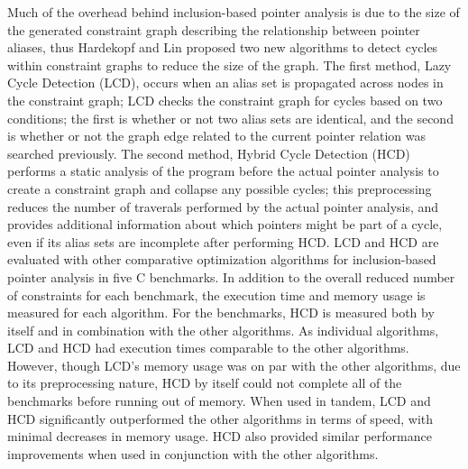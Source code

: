 Much of the overhead behind inclusion-based pointer analysis is due to the size of the generated constraint graph describing the relationship between pointer aliases, thus Hardekopf and Lin \cite{Hardekopf} proposed two new algorithms to detect cycles within constraint graphs to reduce the size of the graph. The first method, Lazy Cycle Detection (LCD), occurs when an alias set is propagated across nodes in the constraint graph; LCD checks the constraint graph for cycles based on two conditions; the first is whether or not two alias sets are identical, and the second is whether or not the graph edge related to the current pointer relation was searched previously. The second method, Hybrid Cycle Detection (HCD) performs a static analysis of the program before the actual pointer analysis to create a constraint graph and collapse any possible cycles; this preprocessing reduces the number of traverals performed by the actual pointer analysis, and provides additional information about which pointers might be part of a cycle, even if its alias sets are incomplete after performing HCD. LCD and HCD are evaluated with other comparative optimization algorithms for inclusion-based pointer analysis in five C benchmarks. In addition to the overall reduced number of constraints for each benchmark, the execution time and memory usage is measured for each algorithm. For the benchmarks, HCD is measured both by itself and in combination with the other algorithms. As individual algorithms, LCD and HCD had execution times comparable to the other algorithms. However, though LCD's memory usage was on par with the other algorithms, due to its preprocessing nature, HCD by itself could not complete all of the benchmarks before running out of memory. When used in tandem, LCD and HCD significantly outperformed the other algorithms in terms of speed, with minimal decreases in memory usage. HCD also provided similar performance improvements when used in conjunction with the other algorithms.

